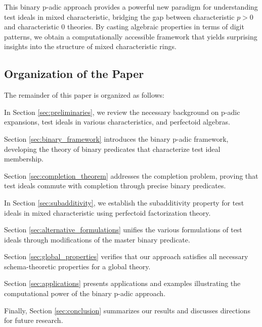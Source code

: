 This binary p-adic approach provides a powerful new paradigm for understanding test ideals in mixed characteristic, bridging the gap between characteristic $p > 0$ and characteristic 0 theories. By casting algebraic properties in terms of digit patterns, we obtain a computationally accessible framework that yields surprising insights into the structure of mixed characteristic rings.

\subsection{Organization of the Paper}

The remainder of this paper is organized as follows:

In Section \ref{sec:preliminaries}, we review the necessary background on p-adic expansions, test ideals in various characteristics, and perfectoid algebras.

Section \ref{sec:binary_framework} introduces the binary p-adic framework, developing the theory of binary predicates that characterize test ideal membership.

Section \ref{sec:completion_theorem} addresses the completion problem, proving that test ideals commute with completion through precise binary predicates.

In Section \ref{sec:subadditivity}, we establish the subadditivity property for test ideals in mixed characteristic using perfectoid factorization theory.

Section \ref{sec:alternative_formulations} unifies the various formulations of test ideals through modifications of the master binary predicate.

Section \ref{sec:global_properties} verifies that our approach satisfies all necessary schema-theoretic properties for a global theory.

Section \ref{sec:applications} presents applications and examples illustrating the computational power of the binary p-adic approach.

Finally, Section \ref{sec:conclusion} summarizes our results and discusses directions for future research. 